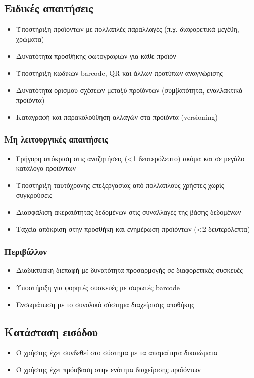 \documentclass[12pt,a4paper,twoside]{book}
\begin{document}
\subsection{Ειδικές απαιτήσεις} %
\begin{itemize}
  \item Υποστήριξη προϊόντων με πολλαπλές παραλλαγές (π.χ. διαφορετικά μεγέθη, χρώματα) %
  \item Δυνατότητα προσθήκης φωτογραφιών για κάθε προϊόν
  \item Υποστήριξη κωδικών barcode, QR και άλλων προτύπων αναγνώρισης %
  \item Δυνατότητα ορισμού σχέσεων μεταξύ προϊόντων (συμβατότητα, εναλλακτικά προϊόντα)
  \item Καταγραφή και παρακολούθηση αλλαγών στα προϊόντα (versioning)
\end{itemize}

\subsubsection{Μη λειτουργικές απαιτήσεις}
\begin{itemize}
  \item Γρήγορη απόκριση στις αναζητήσεις (<1 δευτερόλεπτο) ακόμα και σε μεγάλο κατάλογο προϊόντων %
  \item Υποστήριξη ταυτόχρονης επεξεργασίας από πολλαπλούς χρήστες χωρίς συγκρούσεις
  \item Διασφάλιση ακεραιότητας δεδομένων στις συναλλαγές της βάσης δεδομένων %
  \item Ταχεία απόκριση στην προσθήκη και ενημέρωση προϊόντων (<2 δευτερόλεπτα) %
\end{itemize}

\subsubsection{Περιβάλλον}
\begin{itemize}
  \item Διαδικτυακή διεπαφή με δυνατότητα προσαρμογής σε διαφορετικές συσκευές %
  \item Υποστήριξη για φορητές συσκευές με σαρωτές barcode
  \item Ενσωμάτωση με το συνολικό σύστημα διαχείρισης αποθήκης %
\end{itemize}

\subsection{Κατάσταση εισόδου} %
\begin{itemize}
  \item Ο χρήστης έχει συνδεθεί στο σύστημα με τα απαραίτητα δικαιώματα %
  \item Ο χρήστης έχει πρόσβαση στην ενότητα διαχείρισης προϊόντων %
\end{itemize}
\end{document}
